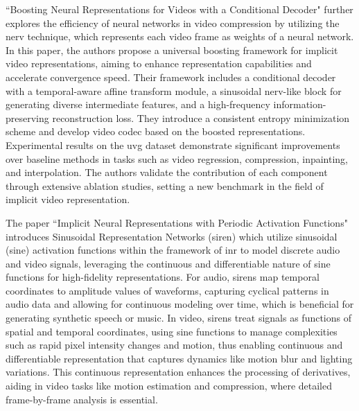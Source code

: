 ``Boosting Neural Representations for Videos with a Conditional Decoder" \cite{zhang2024boosting} further explores the efficiency of neural networks in video compression by utilizing the \gls{nerv} technique, which represents each video frame as weights of a neural network. In this paper, the authors propose a universal boosting framework for implicit video representations, aiming to enhance representation capabilities and accelerate convergence speed. Their framework includes a conditional decoder with a temporal-aware affine transform module, a sinusoidal \gls{nerv}-like block for generating diverse intermediate features, and a high-frequency information-preserving reconstruction loss. They introduce a consistent entropy minimization scheme and develop video \gls{codec} based on the boosted representations. Experimental results on the \gls{uvg} dataset demonstrate significant improvements over baseline methods in tasks such as video regression, compression, inpainting, and interpolation. The authors validate the contribution of each component through extensive ablation studies, setting a new benchmark in the field of implicit video representation.

The paper ``Implicit Neural Representations with Periodic Activation Functions" \cite{sitzmann2020implicit} introduces Sinusoidal Representation Networks (\gls{siren}) which utilize sinusoidal (sine) activation functions within the framework of \gls{inr} to model discrete audio and video signals, leveraging the continuous and differentiable nature of sine functions for high-fidelity representations. For audio, \gls{siren}s map temporal coordinates to amplitude values of waveforms, capturing cyclical patterns in audio data and allowing for continuous modeling over time, which is beneficial for generating synthetic speech or music. In video, \gls{siren}s treat signals as functions of spatial and temporal coordinates, using sine functions to manage complexities such as rapid pixel intensity changes and motion, thus enabling continuous and differentiable representation that captures dynamics like motion blur and lighting variations. This continuous representation enhances the processing of derivatives, aiding in video tasks like motion estimation and compression, where detailed frame-by-frame analysis is essential.

